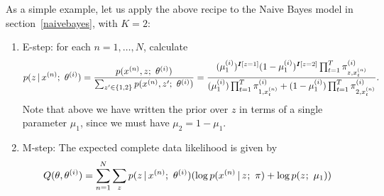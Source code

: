 \documentclass{article}
\begin{document}
As a simple example, let us apply the above recipe to the Naive Bayes model in section~\ref{naivebayes}, with $K=2$:
\begin{enumerate}
\item E-step: for each $n = 1, \dots, N$, calculate
\begin{align*} p(z \given x^{(n)} ; \ \theta^{(i)}) = \frac{p(x^{(n)}, z ; \ \theta^{(i)})}{\sum_{z' \in \{1, 2\}}p(x^{(n)} , z'; \ \theta^{(i)})} = \frac{(\mu_1^{(i)})^{\ident[z = 1]} (1-\mu_1^{(i)})^{\ident[z=2]}\prod_{t=1}^T \pi^{(i)}_{z, x_t^{(n)}}}{(\mu_1^{(i)}) \prod_{t=1}^{T} \pi^{(i)}_{1,x_t^{(n)}} + (1-\mu_1^{(i)}) \prod_{t=1}^{T} \pi^{(i)}_{2,x_t^{(n)}}}.
\end{align*}
Note that above we have written the prior over $z$ in terms of a single parameter $\mu_1$, since we must have $\mu_2 = 1 - \mu_1$.

\item M-step: The expected complete data likelihood is given by 
\begin{align*}
Q(\theta, \theta^{(i)})&= \sum_{n=1}^N \sum_{z} p(z \given x^{(n)} ; \ \theta^{(i)})( \log p(x^{(n)} \given z^{} ;\ \pi ) + \log p( z^{} ;\ \mu_1)) 
\end{align*}


\end{enumerate}
\end{document}
